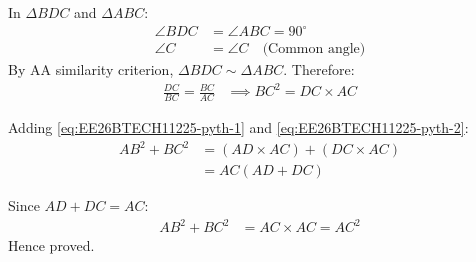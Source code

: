 \begin{enumerate}[label=\thesubsection.\arabic*, ref=\thesubsection.\theenumi]
In $\Delta BDC$ and $\Delta ABC$:
\begin{align}
    \angle BDC &= \angle ABC = 90^\circ \\
    \angle C &= \angle C \quad \text{(Common angle)}
\end{align}
By AA similarity criterion, $\Delta BDC \sim \Delta ABC$.
Therefore:
\begin{align}
    \frac{DC}{BC} = \frac{BC}{AC} &\implies BC^2 = DC \times AC \label{eq:EE26BTECH11225-pyth-2}
\end{align}

Adding \eqref{eq:EE26BTECH11225-pyth-1} and \eqref{eq:EE26BTECH11225-pyth-2}:
\begin{align}
    AB^2 + BC^2 &= (AD \times AC) + (DC \times AC) \\
    &= AC(AD + DC)
\end{align}

Since $AD + DC = AC$:
\begin{align}
    AB^2 + BC^2 &= AC \times AC = AC^2
\end{align}
Hence proved.
    

\end{enumerate}
